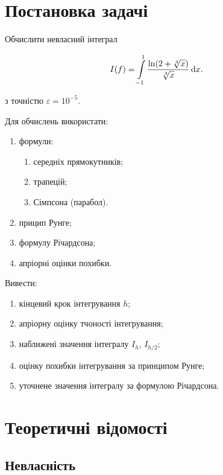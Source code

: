 




\tableofcontents

\section{Постановка задачі}

Обчислити невласний інтеграл 

\begin{equation}
	I(f) = \displaystyle\int\limits_{-1}^1 \frac{\ln (2 + \sqrt[3]{x})}{\sqrt[3]{x}} \mathop{}\!\mathrm{d} x.
\end{equation}

з точністю $\varepsilon = 10^{-5}$. \medskip

Для обчислень використати:

\begin{enumerate}
	\item формули:
	\begin{enumerate}
		\item середніх прямокутників;
		\item трапецій;
		\item Сімпсона (парабол).
	\end{enumerate}
	\item прицип Рунге;
	\item формулу Річардсона;
	\item апріорні оцінки похибки.
\end{enumerate}

Вивести:

\begin{enumerate}
	\item кінцевий крок інтегрування $h$;
	\item апріорну оцінку тчоності інтегрування;
	\item наближені значення інтегралу $I_h$, $I_{h/2}$;
	\item оцінку похибки інтегрування за принципом Рунге;
	\item уточнене значення інтегралу за формулою Річардсона.
\end{enumerate}

\section{Теоретичні відомості}

\subsection{Невласність}

